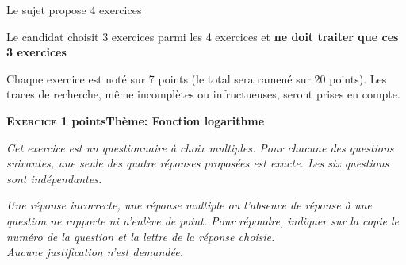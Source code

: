 \documentclass[10pt,a4paper]{article}
\begin{document}
\vspace{0,25cm}

Le sujet propose 4 exercices

Le candidat choisit 3 exercices parmi les 4 exercices et \textbf{ne doit traiter que ces 3 exercices}

Chaque exercice est noté sur 7 points (le total sera ramené sur 20 points).
Les traces de recherche, même incomplètes ou infructueuses, seront prises en compte.

\bigskip

\textbf{\textsc{Exercice 1}  points\hfill Thème: Fonction logarithme }

\medskip

\emph{Cet exercice est un questionnaire à choix multiples. Pour chacune des questions suivantes, une seule des quatre réponses proposées est exacte. Les six questions sont indépendantes.}

\smallskip

\emph{Une réponse incorrecte, une réponse multiple ou l'absence de réponse à une question ne rapporte ni n'enlève de point. Pour répondre, indiquer sur la copie le numéro de la question et la lettre de la réponse choisie. \\
Aucune justification n'est demandée.}

\medskip
\end{document}
